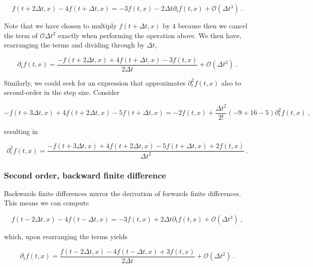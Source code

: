 \documentclass[a4paper,11pt]{article}
\begin{document}
\begin{equation}
f(t+2\Delta t,x) - 4f(t+\Delta t,x) = - 3f(t,x) - 2\Delta t\partial_{t}f(t,x) + \mathcal{O}\left(\Delta t^{3}\right)\ .
\end{equation}

Note that we have chosen to multiply $f(t+\Delta t,x)$ by $4$ because then we cancel the term of $\mathcal{O}\Delta t^{2}$ exactly when performing the operation above. We then have, rearranging the terms and dividing through by $\Delta t$,

\begin{equation}
\boxed{
\partial_{t}f(t,x) = \frac{-f(t+2\Delta t,x)+4f(t+\Delta t,x)-3f(t,x)}{2\Delta t} + \mathcal{O}\left(\Delta t^{2}\right)
}\ .
\end{equation}

Similarly, we could seek for an expression that approximates $\partial_{t}^{2}f(t,x)$ also to second-order in the step size. Consider

\begin{equation}
-f(t+3\Delta t,x) + 4f(t+2\Delta t,x) - 5f(t+\Delta t,x) = -2f(t,x) + \frac{\Delta t^{2}}{2!}\left(-9 + 16 -5\right)\partial_{t}^{2}f(t,x)\ ,
\end{equation}

resulting in

\begin{equation}
\boxed{\partial_{t}^{2}f(t,x) = \frac{-f(t+3\Delta t,x) + 4f(t+2\Delta t,x) - 5f(t+\Delta t,x) + 2f(t,x)}{\Delta t^{2}}}\ .
\end{equation}

\subsubsection{Second order, backward finite difference}

Backwards finite differences mirror the derivation of forwards finite differences. This means we can compute

\begin{equation}
f(t-2\Delta t,x) - 4f(t-\Delta t,x) = - 3f(t,x) + 2\Delta t\partial_{t}f(t,x) + \mathcal{O}\left(\Delta t^{3}\right)\ ,
\end{equation}

which, upon rearranging the terms yields

\begin{equation}
\boxed{
\partial_{t}f(t,x) = \frac{f(t-2\Delta t,x)-4f(t-\Delta t,x)+3f(t,x)}{2\Delta t} + \mathcal{O}\left(\Delta t^{2}\right)
}\ .
\end{equation}
\end{document}
